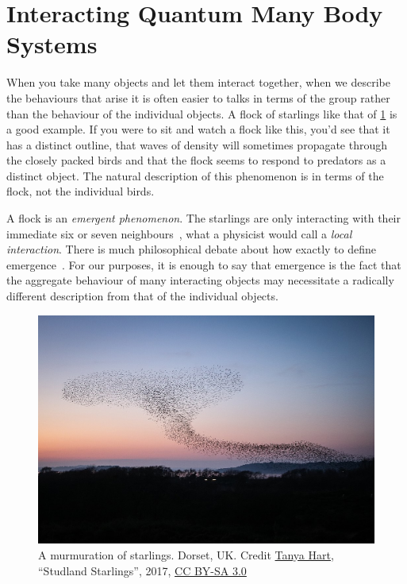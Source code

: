 \hypertarget{interacting-quantum-many-body-systems}{%
\section{Interacting Quantum Many Body Systems}\label{interacting-quantum-many-body-systems}}

When you take many objects and let them interact together, when we describe the behaviours that arise it is often easier to talks in terms of the group rather than the behaviour of the individual objects. A flock of starlings like that of \cref{fig:Studland_Starlings} is a good example. If you were to sit and watch a flock like this, you'd see that it has a distinct outline, that waves of density will sometimes propagate through the closely packed birds and that the flock seems to respond to predators as a distinct object. The natural description of this phenomenon is in terms of the flock, not the individual birds.

A flock is an \emph{emergent phenomenon}. The starlings are only interacting with their immediate six or seven neighbours~\autocite{king2012murmurations,balleriniInteractionRulingAnimal2008}, what a physicist would call a \emph{local interaction}. There is much philosophical debate about how exactly to define emergence~\autocite{andersonMoreDifferent1972,kivelsonDefiningEmergencePhysics2016}. For our purposes, it is enough to say that emergence is the fact that the aggregate behaviour of many interacting objects may necessitate a radically different description from that of the individual objects.

\hypertarget{fig:Studland_Starlings}{%
\begin{figure}
\centering
\includegraphics[width=1\textwidth,height=\textheight]{figure_code/intro_chapter/Studland_Starlings.jpeg}
\caption[{A murmuration of Starlings}]{A murmuration of starlings. Dorset, UK. Credit \href{https://twitter.com/arripay}{Tanya Hart}, ``Studland Starlings'', 2017, \href{https://creativecommons.org/licenses/by-sa/3.0/deed.en}{CC BY-SA 3.0}}
\label{fig:Studland_Starlings}
\end{figure}
}

